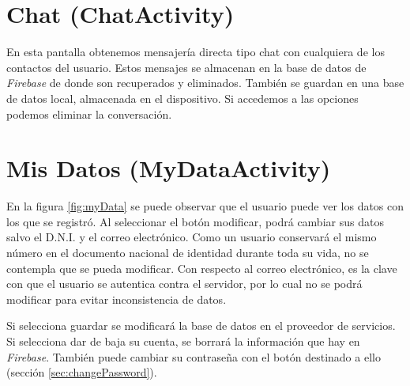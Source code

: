 	\section{Chat ({\ttfamily ChatActivity})} \label{sec:chat}
	
		En esta pantalla obtenemos mensajería directa tipo chat con cualquiera de los contactos del usuario. Estos mensajes se almacenan en la base de datos de {\it Firebase} de donde son recuperados y eliminados. También se guardan en una base de datos local, almacenada en el dispositivo. Si accedemos a las opciones podemos eliminar la conversación.
	
	\section{Mis Datos ({\ttfamily MyDataActivity})} \label{sec:myData}
	
		En la figura \ref{fig:myData} se puede observar que el usuario puede ver los datos con los que se registró. Al seleccionar el botón modificar, podrá cambiar sus datos salvo el D.N.I. y el correo electrónico. Como un usuario conservará el mismo número en el documento nacional de identidad durante toda su vida, no se contempla que se pueda modificar. Con respecto al correo electrónico, es la clave con que el usuario se autentica contra el servidor, por lo cual no se podrá modificar para evitar inconsistencia de datos.
		
		\bigskip
		Si selecciona guardar se modificará la base de datos en el proveedor de servicios.
		Si selecciona dar de baja su cuenta, se borrará la información que hay en {\it Firebase}. También puede cambiar su contraseña con el botón destinado a ello (sección \ref{sec:changePassword}).
		
